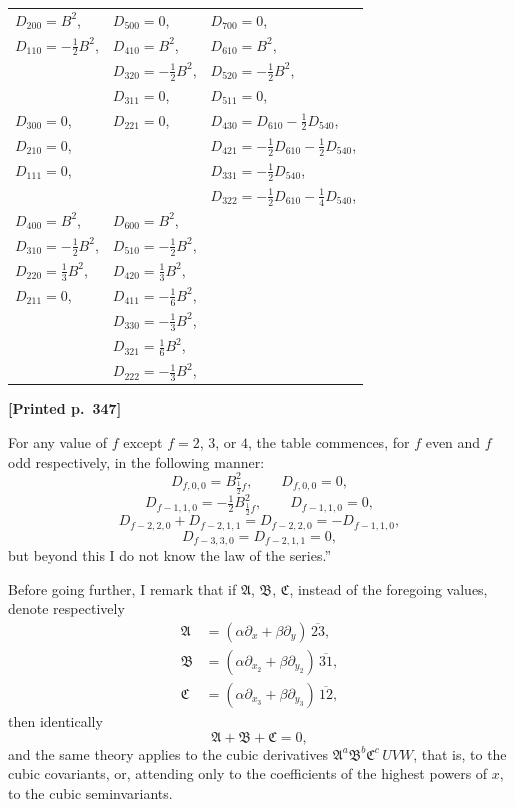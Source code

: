 \documentclass[11pt]{article}
\begin{document}
\begin{center}
\small
\begin{tabular}{lll}
$D_{200} = B^{2}$, & $D_{500} = 0$, & $D_{700} = 0$, \\
$D_{110} = -\tfrac{1}{2}B^{2}$, & $D_{410} = B^{2}$, & $D_{610} = B^{2}$, \\
& $D_{320} = -\tfrac{1}{2}B^{2}$, & $D_{520} = -\tfrac{1}{2}B^{2}$, \\
& $D_{311} = 0$, & $D_{511} = 0$, \\
$D_{300} = 0$, & $D_{221} = 0$, & $D_{430} = D_{610} - \tfrac{1}{2}D_{540}$, \\
$D_{210} = 0$, & & $D_{421} = -\tfrac{1}{2}D_{610} - \tfrac{1}{2}D_{540}$, \\
$D_{111} = 0$, & & $D_{331} = -\tfrac{1}{2}D_{540}$, \\
& & $D_{322} = -\tfrac{1}{2}D_{610} - \tfrac{1}{4}D_{540}$, \\
$D_{400} = B^{2}$, & $D_{600} = B^{2}$, & \\
$D_{310} = -\tfrac{1}{2}B^{2}$, & $D_{510} = -\tfrac{1}{2}B^{2}$, & \\
$D_{220} = \tfrac{1}{3}B^{2}$, & $D_{420} = \tfrac{1}{3}B^{2}$, & \\
$D_{211} = 0$, & $D_{411} = -\tfrac{1}{6}B^{2}$, & \\
& $D_{330} = -\tfrac{1}{3}B^{2}$, & \\
& $D_{321} = \tfrac{1}{6}B^{2}$, & \\
& $D_{222} = -\tfrac{1}{3}B^{2}$, & \\
\end{tabular}
\end{center}

\medskip

\noindent\textbf{[Printed p.~347]}\hfill

For any value of $f$ except $f = 2$, $3$, or $4$, the table commences, for $f$ even and $f$ odd respectively, in the following manner:
\[
D_{f, 0, 0} = B_{\frac{1}{2}f}^{2},\qquad D_{f, 0, 0} = 0,
\]
\[
D_{f - 1, 1, 0} = -\tfrac{1}{2}B_{\frac{1}{2}f}^{2},\qquad D_{f - 1, 1, 0} = 0,
\]
\[
D_{f - 2, 2, 0} + D_{f - 2, 1, 1} = D_{f - 2, 2, 0} = -D_{f - 1, 1, 0},
\]
\[
D_{f - 3, 3, 0} = D_{f - 2, 1, 1} = 0,
\]
but beyond this I do not know the law of the series.''

Before going further, I remark that if $\mathfrak{A}$, $\mathfrak{B}$, $\mathfrak{C}$, instead of the foregoing values, denote respectively
\begin{align*}
\mathfrak{A} &= (\alpha\partial_{x} + \beta\partial_{y})\,\overline{23},\\
\mathfrak{B} &= (\alpha\partial_{x_{2}} + \beta\partial_{y_{2}})\,\overline{31},\\
\mathfrak{C} &= (\alpha\partial_{x_{3}} + \beta\partial_{y_{3}})\,\overline{12},
\end{align*}
then identically
\[
\mathfrak{A} + \mathfrak{B} + \mathfrak{C} = 0,
\]
and the same theory applies to the cubic derivatives $\mathfrak{A}^{a}\mathfrak{B}^{b}\mathfrak{C}^{c}\, UVW$, that is, to the cubic covariants, or, attending only to the coefficients of the highest powers of $x$, to the cubic seminvariants.
\end{document}
